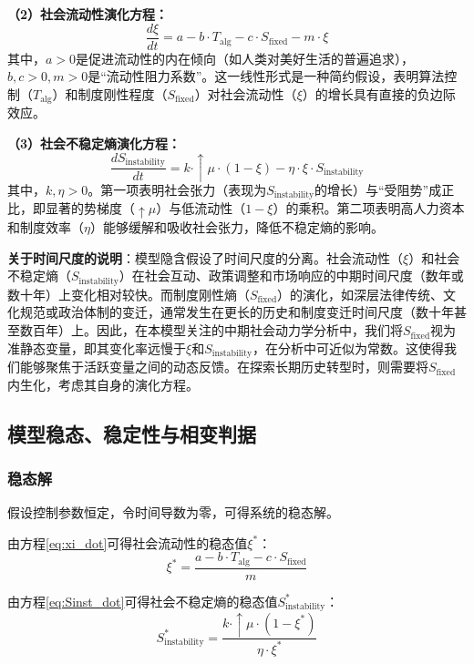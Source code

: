\documentclass[twocolumn]{ctexart}
\newcommand{\upmu}{\uparrow\!\mu}
\newcommand{\upxi}{\xi}
\newcommand{\upeta}{\eta}
\newcommand{\Sfix}{S_{\mathrm{fixed}}}
\newcommand{\Sinst}{S_{\mathrm{instability}}}
\newcommand{\Talg}{T_{\mathrm{alg}}}
\begin{document}
\textbf{（2）社会流动性演化方程：}
\begin{equation}\label{eq:xi_dot}
\frac{d\upxi}{dt} = a - b \cdot \Talg - c \cdot \Sfix - m \cdot \upxi
\end{equation}
其中，$a>0$是促进流动性的内在倾向（如人类对美好生活的普遍追求），$b,c>0,m>0$是“流动性阻力系数”。这一线性形式是一种简约假设，表明算法控制（$\Talg$）和制度刚性程度（$\Sfix$）对社会流动性（$\upxi$）的增长具有直接的负边际效应。

\textbf{（3）社会不稳定熵演化方程：}
\begin{equation}\label{eq:Sinst_dot}
\frac{d\Sinst}{dt} = k \cdot \upmu \cdot (1-\upxi) - \upeta \cdot \upxi \cdot \Sinst
\end{equation}
其中，$k,\upeta>0$。第一项表明社会张力（表现为$\Sinst$的增长）与“受阻势”成正比，即显著的势梯度（$\upmu$）与低流动性（$1-\upxi$）的乘积。第二项表明高人力资本和制度效率（$\upeta$）能够缓解和吸收社会张力，降低不稳定熵的影响。

\textbf{关于时间尺度的说明}：模型隐含假设了时间尺度的分离。社会流动性（$\upxi$）和社会不稳定熵（$\Sinst$）在社会互动、政策调整和市场响应的中期时间尺度（数年或数十年）上变化相对较快。而制度刚性熵（$\Sfix$）的演化，如深层法律传统、文化规范或政治体制的变迁，通常发生在更长的历史和制度变迁时间尺度（数十年甚至数百年）上。因此，在本模型关注的中期社会动力学分析中，我们将$\Sfix$视为准静态变量，即其变化率远慢于$\upxi$和$\Sinst$，在分析中可近似为常数。这使得我们能够聚焦于活跃变量之间的动态反馈。在探索长期历史转型时，则需要将$\Sfix$内生化，考虑其自身的演化方程。

\subsection{模型稳态、稳定性与相变判据}

\subsubsection{稳态解}

假设控制参数恒定，令时间导数为零，可得系统的稳态解。

由方程\eqref{eq:xi_dot}可得社会流动性的稳态值$\upxi^*$：
\begin{equation}\label{eq:xi_steady}
\upxi^* = \frac{a - b \cdot \Talg - c \cdot \Sfix}{m}
\end{equation}

由方程\eqref{eq:Sinst_dot}可得社会不稳定熵的稳态值$\Sinst^*$：
\begin{equation}\label{eq:Sinst_steady}
\Sinst^* = \frac{k \cdot \upmu \cdot (1-\upxi^*)}{\upeta \cdot \upxi^*}
\end{equation}
\end{document}
